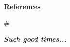 \documentclass[aspectratio=169]{beamer}
\begin{document}
\begin{markdown}
\begin{frame}{\huge{\textbf{References}}}
\renewcommand{\bibfont}{\footnotesize}




\end{frame}


# 


\begin{frame}{}
  \centering \Huge
  \textbf{\emph{Such good times...}}
\end{frame}


\end{markdown}
\end{document}
